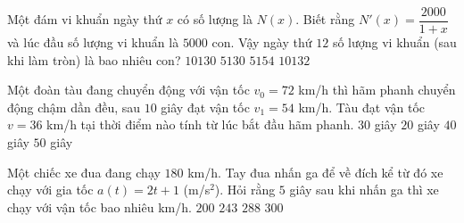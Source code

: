 \begin{ex}%
	Một đám vi khuẩn ngày thứ $x$ có số lượng là $N(x)$. Biết rằng $N'(x)=\dfrac{2000}{1+x}$ và lúc đầu số lượng vi khuẩn là $5000$ con. Vậy ngày thứ $12$ số lượng vi khuẩn (sau khi làm tròn) là bao nhiêu con?
	\choice
	{\True $10130$}
	{$5130$}
	{$5154$}
	{$10132$}
\end{ex}
\begin{ex}%
	Một đoàn tàu đang chuyển động với vận tốc $v_0=72$ km/h thì hãm phanh chuyển động chậm dần đều, sau $10$ giây đạt vận tốc $v_1=54$ km/h. Tàu đạt vận tốc $v=36$ km/h tại thời điểm nào tính từ lúc bắt đầu hãm phanh. 
	\choice
	{$30$ giây}
	{\True $20$ giây}
	{$40$ giây}
	{$50$ giây}
\end{ex}
\begin{ex}%
	Một chiếc xe đua đang chạy $180$ km/h. Tay đua nhấn ga để về đích kể từ đó xe chạy với gia tốc $a(t)=2t+1$ (m/s$^2$). Hỏi rằng $5$ giây sau khi nhấn ga thì xe chạy với vận tốc bao nhiêu km/h. 
	\choice
	{$200$}
	{$243$}
	{\True $288$}
	{$300$}
\end{ex}
